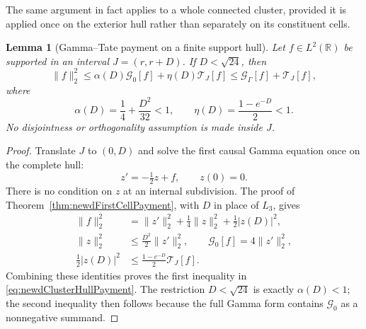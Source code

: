 \documentclass[11pt]{amsart}
\newtheorem{lemma}[theorem]{Lemma}
\theoremstyle{definition}
\theoremstyle{remark}
\newcommand{\R}{\mathbb R}
\begin{document}
The same argument in fact applies to a whole connected cluster, provided it
is applied once on the exterior hull rather than separately on its
constituent cells.

\begin{lemma}[Gamma--Tate payment on a finite support hull]
\label{lem:newdClusterHull}
Let $f\in L^2(\R)$ be supported in an interval $J=(r,r+D)$.  If
$D<\sqrt{24}$, then
\begin{equation}\label{eq:newdClusterHullPayment}
 \|f\|_2^2
 \leq \alpha(D)\mathcal G_0[f]
       +\eta(D)\mathcal T_J[f]
 \leq \mathcal G_\Gamma[f]+\mathcal T_J[f],
\end{equation}
where
\begin{equation}\label{eq:newdClusterHullConstants}
 \alpha(D)=\frac14+\frac{D^2}{32}<1,
 \qquad
 \eta(D)=\frac{1-e^{-D}}2<1.
\end{equation}
No disjointness or orthogonality assumption is made inside $J$.
\end{lemma}

\begin{proof}
Translate $J$ to $(0,D)$ and solve the first causal Gamma equation once on
the complete hull:
\[
 z'=-\tfrac12z+f,
 \qquad z(0)=0.
\]
There is no condition on $z$ at an internal subdivision.  The proof of
Theorem~\ref{thm:newdFirstCellPayment}, with $D$ in place of $L_3$, gives
\begin{align*}
 \|f\|_2^2
 &=\|z'\|_2^2+\tfrac14\|z\|_2^2+\tfrac12|z(D)|^2,\\
 \|z\|_2^2&\leq\tfrac{D^2}{2}\|z'\|_2^2,
 \qquad
 \mathcal G_0[f]=4\|z'\|_2^2,\\
 \tfrac12|z(D)|^2
 &\leq\tfrac{1-e^{-D}}2\mathcal T_J[f].
\end{align*}
Combining these identities proves the first inequality in
\eqref{eq:newdClusterHullPayment}.  The restriction $D<\sqrt{24}$ is
exactly $\alpha(D)<1$; the second inequality then follows because the full
Gamma form contains $\mathcal G_0$ as a nonnegative summand.
\end{proof}
\end{document}
